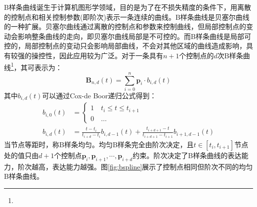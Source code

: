 B样条曲线诞生于计算机图形学领域，目的是为了在不损失精度的条件下，用离散的控制点和相关控制参数(即阶次)表示一条连续的曲线。B样条曲线是贝塞尔曲线的一种扩展。贝塞尔曲线通过离散的控制点和参数来控制曲线，但局部控制点的变动会影响整条曲线的走向，即贝塞尔曲线局部是不可控的。而B样条曲线是局部可控的，局部控制点的变动只会影响局部曲线，不会对其他区域的曲线造成影响，具有较强的操控性，因此应用较为广泛。对于一条具有$n+1$个控制点的$d$次B样条曲线\footnote{}，其可表示为：
\begin{equation}
  \label{equ:b_spline_origin}
  \boldsymbol{B}_{n,d}(t)=\sum_{i=0}^{n}\boldsymbol{p}_i\cdot b_{i,d}(t)
\end{equation}
其中$b_{i,d}(t)$可以通过Cox-de Boor递归公式\cite{de1978practical}得到：
\begin{equation}
  \begin{aligned}
    b_{i,0}(t) & =\begin{cases}
                    1\quad t_i\le t\le t_{i+1} \\
                    0\quad\dots
                  \end{cases}                                                                \\
    b_{i,d}(t) & =\frac{t-t_i}{t_{i+d}-t_i}b_{i,d-1}(t)+\frac{t_{i+d+1}-t}{t_{i+d+1}-t_{i+1}}b_{i+1,d-1}(t)
  \end{aligned}
\end{equation}
当节点等距时，称B样条均匀。均匀B样条完全由阶次决定，且$t\in[t_i,t_{i+1}]$节点处的值只由$d+1$个控制点$\boldsymbol{p}_i,\boldsymbol{p}_{i+1},\cdots,\boldsymbol{p}_{i+d}$约束。阶次决定了B样条曲线的表达能力，阶次越高，表达能力越强。图\ref{fig:bspline}展示了控制点相同但阶次不同的均匀B样条曲线。

